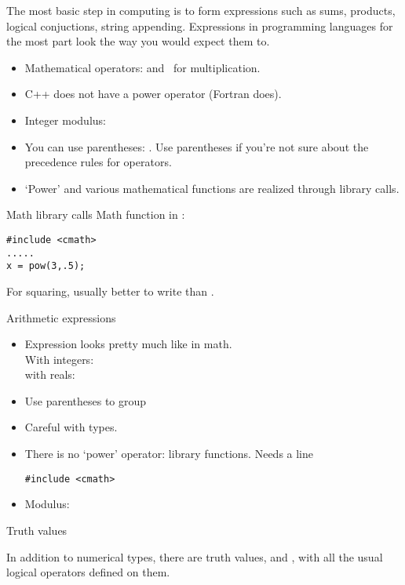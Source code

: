 The most basic step in computing is to form expressions such as sums,
products, logical conjuctions, string appending. Expressions in
programming languages for the most part look the way you would expect
them to.
\begin{itemize}
\item Mathematical operators: \n{+ - /} and \n{*}~for multiplication.
\item C++ does not have a power operator (Fortran does).
\item Integer modulus:~
\item You can use parentheses: . Use parentheses if you're
  not sure about the precedence rules for operators.
\item `Power' and various mathematical functions are realized through
  library calls.
\end{itemize}

\begin{block}{Math library calls}
  \label{sl:cmath}
  Math function in :
\begin{verbatim}
#include <cmath>
.....
x = pow(3,.5);
\end{verbatim}
For squaring, usually better to write  than .
\end{block}

\begin{block}{Arithmetic expressions}
  \label{sl:arith-expr}
  \begin{itemize}
  \item
    Expression looks pretty much like in math.\\
    With integers: \\
    with reals: 
  \item Use parentheses to group 
  \item Careful with types.
  \item There is no `power' operator: library functions. Needs a line
\begin{verbatim}
#include <cmath>
\end{verbatim}
  \item Modulus: 
  \end{itemize}
\end{block}

 {Truth values}

In addition to numerical types, there are truth values,
 and , with all the usual logical
operators defined on them.

